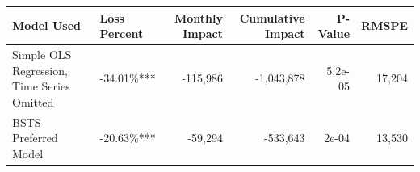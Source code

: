 
\begin{tabular}{l|l|r|r|r|r}
\hline
\textbf{Model Used} & Loss Percent & Monthly Impact & Cumulative Impact & P-Value & RMSPE\\
\hline
Simple OLS Regression, Time Series Omitted & -34.01\%*** & -115,986 & -1,043,878 & 5.2e-05 & 17,204\\
\hline
BSTS Preferred Model & -20.63\%*** & -59,294 & -533,643 & 2e-04 & 13,530\\
\hline
\end{tabular}
